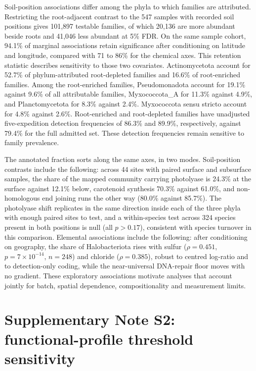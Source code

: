 \documentclass[11pt]{article}
\begin{document}
Soil-position associations differ among the phyla to which families are attributed. Restricting
the root-adjacent contrast to the 547 samples with recorded soil positions gives 101{,}897 testable
families, of which 20{,}136 are more abundant beside roots and 41{,}046 less abundant at 5\% FDR.
On the same sample cohort, 94.1\% of marginal associations retain significance after conditioning
on latitude and longitude, compared with 71 to 86\% for the chemical axes. This retention statistic
describes sensitivity to those two covariates. Actinomycetota account for 52.7\% of phylum-attributed
root-depleted families and 16.6\% of root-enriched families. Among the root-enriched families,
Pseudomonadota account for 19.1\% against 9.6\% of all attributable families, Myxococcota\_A for
11.3\% against 4.9\%, and Planctomycetota for 8.3\% against 2.4\%. Myxococcota sensu stricto
account for 4.8\% against 2.6\%. Root-enriched and root-depleted families have unadjusted
five-expedition detection frequencies of 86.3\% and 89.9\%, respectively, against 79.4\% for the
full admitted set. These detection frequencies remain sensitive to family prevalence.

The annotated fraction sorts along the same axes, in two modes. Soil-position contrasts include the following:
across 44 sites with paired surface and subsurface samples, the share of the mapped community
carrying photolyase is 24.3\% at the surface against 12.1\% below, carotenoid synthesis 70.3\%
against 61.0\%, and non-homologous end joining runs the other way (80.0\% against 85.7\%). The photolyase shift replicates in the same direction inside each of
the three phyla with enough paired sites to test, and a within-species test across 324 species
present in both positions is null (all $p > 0.17$), consistent with species turnover in this comparison. Elemental associations include the following: after conditioning on geography,
the share of Halobacteriota rises with sulfur ($\rho = 0.451$, $p = 7 \times 10^{-14}$, $n = 248$)
and chloride ($\rho = 0.385$), robust to centred log-ratio and to detection-only coding, while the
near-universal DNA-repair floor moves with no gradient. These exploratory associations motivate analyses that account jointly for batch, spatial dependence, compositionality and measurement limits.


\section*{Supplementary Note S2: functional-profile threshold sensitivity}
\end{document}
